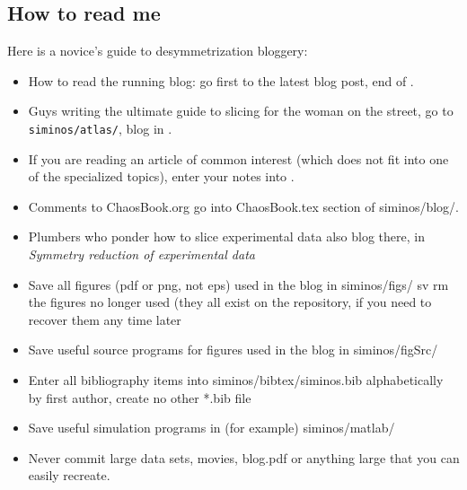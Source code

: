 
\newcommand{\version}{atlas ver. 1.3, Jun 15 2012}


\subsection{How to read me}

Here is a novice's guide to desymmetrization bloggery:
\begin{itemize}
  \item
How to read the running blog: go first to the latest blog post, end
of .
  \item
Guys writing the ultimate guide to slicing for the woman on the street,
go to \texttt{siminos/atlas/}, blog in .
  \item
If you are reading an article of common interest (which does not fit into
one of the specialized topics), enter your notes into .
  \item
Comments to ChaosBook.org go into ChaosBook.tex section of siminos/blog/.
  \item
Plumbers who ponder how to slice experimental data also blog there,  in
 {\em Symmetry reduction of experimental data}
  \item
Save all figures (pdf or png, not eps) used in the blog in siminos/figs/
sv rm the figures no longer used (they all exist on the repository, if
you need to recover them any time later
  \item
Save useful source programs for figures used in the blog in siminos/figSrc/
  \item
Enter all bibliography items into siminos/bibtex/siminos.bib alphabetically by
first author, create no other *.bib file
  \item
Save useful simulation programs  in (for example) siminos/matlab/
  \item
Never commit large data sets, movies, blog.pdf or anything large that you
can easily recreate.


\end{itemize}

